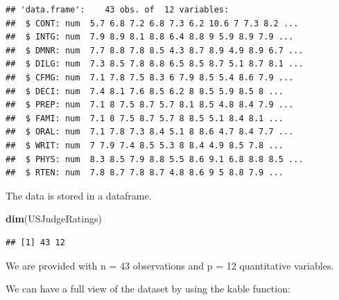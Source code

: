 \documentclass[]{article}
\newenvironment{Shaded}{\begin{snugshade}}{\end{snugshade}}
\newcommand{\DataTypeTok}[1]{\textcolor[rgb]{0.13,0.29,0.53}{#1}}
\newcommand{\FloatTok}[1]{\textcolor[rgb]{0.00,0.00,0.81}{#1}}
\newcommand{\KeywordTok}[1]{\textcolor[rgb]{0.13,0.29,0.53}{\textbf{#1}}}
\newcommand{\NormalTok}[1]{#1}
\newcommand{\OperatorTok}[1]{\textcolor[rgb]{0.81,0.36,0.00}{\textbf{#1}}}
\newcommand{\StringTok}[1]{\textcolor[rgb]{0.31,0.60,0.02}{#1}}
\begin{document}
\begin{verbatim}
## 'data.frame':    43 obs. of  12 variables:
##  $ CONT: num  5.7 6.8 7.2 6.8 7.3 6.2 10.6 7 7.3 8.2 ...
##  $ INTG: num  7.9 8.9 8.1 8.8 6.4 8.8 9 5.9 8.9 7.9 ...
##  $ DMNR: num  7.7 8.8 7.8 8.5 4.3 8.7 8.9 4.9 8.9 6.7 ...
##  $ DILG: num  7.3 8.5 7.8 8.8 6.5 8.5 8.7 5.1 8.7 8.1 ...
##  $ CFMG: num  7.1 7.8 7.5 8.3 6 7.9 8.5 5.4 8.6 7.9 ...
##  $ DECI: num  7.4 8.1 7.6 8.5 6.2 8 8.5 5.9 8.5 8 ...
##  $ PREP: num  7.1 8 7.5 8.7 5.7 8.1 8.5 4.8 8.4 7.9 ...
##  $ FAMI: num  7.1 8 7.5 8.7 5.7 8 8.5 5.1 8.4 8.1 ...
##  $ ORAL: num  7.1 7.8 7.3 8.4 5.1 8 8.6 4.7 8.4 7.7 ...
##  $ WRIT: num  7 7.9 7.4 8.5 5.3 8 8.4 4.9 8.5 7.8 ...
##  $ PHYS: num  8.3 8.5 7.9 8.8 5.5 8.6 9.1 6.8 8.8 8.5 ...
##  $ RTEN: num  7.8 8.7 7.8 8.7 4.8 8.6 9 5 8.8 7.9 ...
\end{verbatim}

The data is stored in a dataframe.

\begin{Shaded}
\begin{Highlighting}[]
\KeywordTok{dim}\NormalTok{(USJudgeRatings)}
\end{Highlighting}
\end{Shaded}

\begin{verbatim}
## [1] 43 12
\end{verbatim}

We are provided with n = 43 observations and p = 12 quantitative
variables.

We can have a full view of the dataset by using the kable function:

\begin{Shaded}
\end{Shaded}
\end{document}
